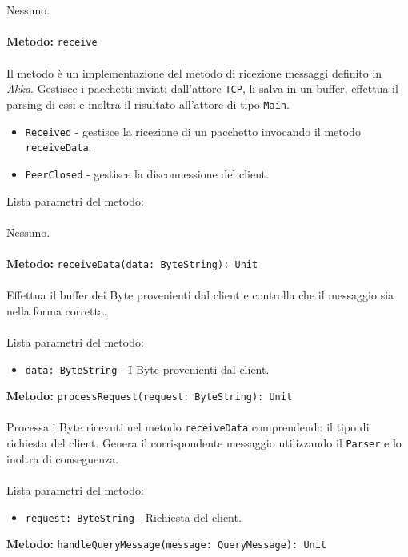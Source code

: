 \documentclass[a4paper]{article}
\begin{document}
			\\ \\
			Nessuno.
			\\ \\
		\textbf{Metodo: }\texttt{receive}
			\\ \\
			Il metodo è un implementazione del metodo di ricezione messaggi definito in \emph{Akka}. Gestisce i pacchetti inviati dall'attore \texttt{TCP}, li salva in un buffer, effettua il parsing di essi e inoltra il risultato all'attore di tipo \texttt{Main}.
			\begin{itemize}
				\item \texttt{Received} - gestisce la ricezione di un pacchetto invocando il metodo \texttt{receiveData}.
				\item \texttt{PeerClosed} - gestisce la disconnessione del client.
			\end{itemize}
			Lista parametri del metodo:
			\\ \\
			Nessuno.
			\\ \\
		\textbf{Metodo: }\texttt{receiveData(data: ByteString): Unit}
			\\ \\
			Effettua il  buffer dei Byte provenienti dal client e controlla che il messaggio sia nella forma corretta.
			\\ \\
			Lista parametri del metodo:
			\begin{itemize}
				\item \texttt{data: ByteString} - I Byte provenienti dal client.
			\end{itemize}
		\textbf{Metodo: }\texttt{processRequest(request: ByteString): Unit}
			\\ \\
			Processa i Byte ricevuti nel metodo \texttt{receiveData} comprendendo il tipo di richiesta del client. Genera il corrispondente messaggio utilizzando il \texttt{Parser} e lo inoltra di conseguenza.
			\\ \\
			Lista parametri del metodo:
			\begin{itemize}
				\item \texttt{request: ByteString} - Richiesta del client.
			\end{itemize}
		\textbf{Metodo: }\texttt{handleQueryMessage(message: QueryMessage): Unit}
			\\ \\
\end{document}
